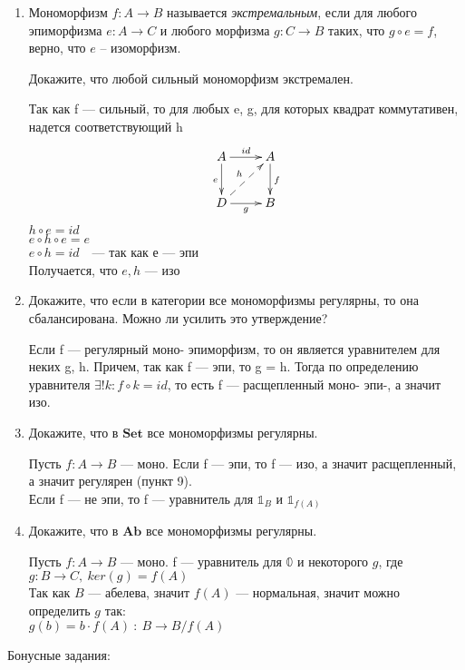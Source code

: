 \documentclass[draft]{article}
\newcommand{\cat}[1]{\mathbf{#1}}
\newcommand{\Set}{\cat{Set}}
\newcommand{\Ab}{\cat{Ab}}
\begin{document}
\begin{enumerate}
\item Мономорфизм $f : A \to B$ называется \emph{экстремальным}, если для любого эпиморфизма $e : A \to C$ и любого морфизма $g : C \to B$ таких, что $g \circ e = f$, верно, что $e$ -- изоморфизм.

Докажите, что любой сильный мономорфизм экстремален.

Так как f --- сильный, то для любых e, g, для которых квадрат коммутативен, надется соответствующий h
\[ \xymatrix{ A \ar[r]^{id} \ar[d]_e      & A \ar[d]^f \\
              D \ar[r]_g \ar@{-->}[ur]^h & B
            } \]
$h \circ e = id$\\
$e \circ h \circ e = e$\\
$e \circ h = id~~~$ --- так как е --- эпи\\
Получается, что $e, h$ --- изо

\item Докажите, что если в категории все мономорфизмы регулярны, то она сбалансирована. Можно ли усилить это утверждение?

Если f --- регулярный моно- эпиморфизм, то он является уравнителем для неких g, h. Причем, так как f --- эпи, то g = h. Тогда по определению уравнителя $\exists!k: f \circ k = id$, то есть f --- расщепленный моно- эпи-, а значит изо.

\item Докажите, что в $\Set$ все мономорфизмы регулярны.

Пусть $f : A \to B$ --- моно. Если f --- эпи, то f --- изо, а значит расщепленный, а значит регулярен (пункт 9). \\
Если f --- не эпи, то f --- уравнитель для $\mathbb{1}_B$ и $\mathbb{1}_{f(A)}$

\item Докажите, что в $\Ab$ все мономорфизмы регулярны.

Пусть $f : A \to B$ --- моно. f --- уравнитель для $\mathbb{0}$ и некоторого $g$, где $g: B \to C, ~ker(g) = f(A)$\\
Так как $B$ --- абелева, значит $f(A)$ --- нормальная, значит можно определить $g$ так:\\
$g (b) = b\cdot f(A) ~:~ B \to B/f(A)$ 

\end{enumerate}

Бонусные задания:
\end{document}
